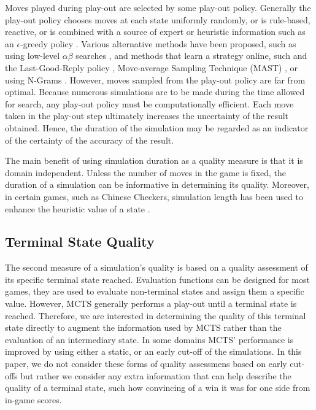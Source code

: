 \documentclass{ecai2014}
\begin{document}
Moves played during play-out are selected by some play-out policy. Generally the play-out policy chooses moves at each state uniformly randomly, or is rule-based, reactive, or is combined with a source of expert or heuristic information such as an $\epsilon$-greedy policy \cite{sturtevant2008analysis, sutton1998reinforcement}. Various alternative methods have been proposed, such as using low-level $\alpha\beta$ searches \cite{Winands2011}, and methods that learn a strategy online, such and the Last-Good-Reply policy \cite{baier2010power}, Move-average Sampling Technique (MAST) \cite{finnsson2008simulation}, or using N-Grams \cite{Tak2012}. However, moves sampled from the play-out policy are far from optimal. Because numerous simulations are to be made during the time allowed for search, any play-out policy must be computationally efficient. Each move taken in the play-out step ultimately increases the uncertainty of the result obtained. Hence, the duration of the simulation may be regarded as an indicator of the certainty of the accuracy of the result.

The main benefit of using simulation duration as a quality measure is that it is domain independent. Unless the number of moves in the game is fixed, the duration of a simulation can be informative in determining its quality. Moreover, in certain games, such as Chinese Checkers, simulation length has been used to enhance the heuristic value of a state \cite{roschke2013cc}.

\subsection{Terminal State Quality}
\label{sub:termqual}
The second measure of a simulation's quality is based on a quality assessment of its specific terminal state reached. Evaluation functions can be designed for most games, they are used to evaluate non-terminal states and assign them a specific value. However, MCTS generally performs a play-out until a terminal state is reached. Therefore, we are interested in determining the quality of this terminal state directly to augment the information used by MCTS rather than the evaluation of an intermediary state. In some domains MCTS' performance is improved by using either a static, or an early cut-off of the simulations. In this paper, we do not consider these forms of quality assessmens based on early cut-offs but rather we consider any extra information that can help describe the quality of a terminal state, such how convincing of a win it was for one side from in-game scores. 
\end{document}
